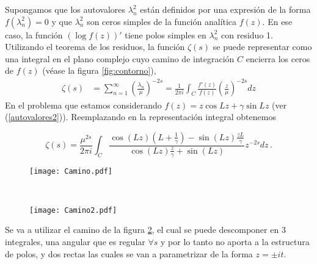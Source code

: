 Supongamos que los autovalores $\lambda ^2 _n$ están definidos por una expresión de
la forma $f ( \lambda ^2 _ n ) = 0$ y que $\lambda ^2 _n$  son ceros simples de la función analítica $f (z)$.
En ese caso, la función $( \log f (z))'$ tiene polos simples en $\lambda ^2 _n$ con residuo 1.
Utilizando el teorema de los residuos, la función $\zeta (s)$ se puede representar
como una integral en el plano complejo cuyo camino de integración $C$
encierra los ceros de $f (z)$ (véase la figura \ref{fig:contorno}),
\begin{equation}
\begin{aligned}
   \zeta  (s) &=  \sum _{n=1} ^{\infty} \left( \frac{\lambda _n}{\mu} \right) ^{-2s} 
   =  
   \frac{1}{2 \pi i} \int _{C} \frac{f'(z)}{f(z)} \left( \frac{z}{\mu} \right) ^{-2s} dz 
\end{aligned}
\label{asd}
\end{equation}
En el problema que estamos considerando $f(z) = z \cos Lz + \gamma \sin Lz$ (ver (\ref{autovalores2})). Reemplazando en la representación integral obtenemos


\begin{equation}
	\zeta  (s) = 
    \frac{\mu ^{2s}}{2 \pi i} \int _{C}
    \frac{ \cos (L z) \left(L + \frac{1}{\gamma} \right) - \sin(L z) \frac{z L}{\gamma}
    }
    { \cos(L z) \frac{z}{\gamma} + \sin(L z)
    }
     z  ^{-2 s} dz  \, .
\end{equation}

\begin{figure*}[t!]
    \centering
    \begin{subfigure}[t]{0.5\textwidth}
        \centering
        \texttt{[image: Camino.pdf]}
        \caption{}
        \label{fig.izquierda}
    \end{subfigure}%
    ~ 
    \begin{subfigure}[t]{0.5\textwidth}
        \centering
        \texttt{[image: Camino2.pdf]}
        \caption{}
        \label{fig.derecha}
    \end{subfigure}
    \caption{Estos caminos son los tenidos en cuenta para representar a la {\it función-$\zeta$} como una integral en el plano complejo.}
\label{fig:contorno}
\end{figure*}


Se va a utilizar el camino de la figura \ref{fig.derecha}, el cual se puede descomponer en 3 integrales, una angular que es regular $ \forall s$ y por lo tanto no aporta a la estructura de polos, y dos rectas las cuales se van a parametrizar de la forma $z = \pm i  t$. 

